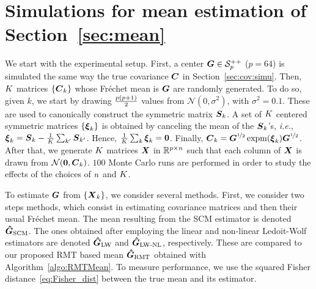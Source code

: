 %     
%     
  

\section{Simulations for mean estimation of Section~\ref{sec:mean}}
\label{app:simu_RMTMean}
We start with the experimental setup.
First, a center $\boldsymbol{G}\in\mathcal{S}^{++}_{p}$ ($p=64$) is simulated the same way the true covariance $\boldsymbol{C}$ in Section~\ref{sec:cov:simu}.
%
Then, $K$ matrices $\{\boldsymbol{C}_k\}$ whose Fréchet mean is $\boldsymbol{G}$ are randomly generated.
To do so, given $k$, we start by drawing $\frac{p(p+1)}{2}$ values from $\mathcal{N}(0,\sigma^2)$, with $\sigma^2=0.1$.
These are used to canonically construct the symmetric matrix $\boldsymbol{S}_k$.
A set of $K$ centered symmetric matrices $\{\boldsymbol{\xi}_k\}$ is obtained by canceling the mean of the $\boldsymbol{S}_k$'s, \emph{i.e.}, $\boldsymbol{\xi}_k = \boldsymbol{S}_k - \frac1{K}\sum_{k'}\boldsymbol{S}_{k'}$.
Hence, $\frac1{K}\sum_k\boldsymbol{\xi}_k=\boldsymbol{0}$.
Finally, $\boldsymbol{C}_k=\boldsymbol{G}^{\nicefrac12}\operatorname{expm}(\boldsymbol{\xi}_k)\boldsymbol{G}^{\nicefrac12}$.
%
After that, we generate $K$ matrices $\boldsymbol{X}$ in $\mathbb{R}^{p\times n}$ such that each column of $\boldsymbol{X}$ is drawn from $\mathcal{N}(\boldsymbol{0},\boldsymbol{C}_k)$.
%
$100$ Monte Carlo runs are performed in order to study the effects of the choices of $n$ and $K$.

To estimate $\boldsymbol{G}$ from $\{\boldsymbol{X}_k\}$, we consider several methods.
First, we consider two steps methods, which consist in estimating covariance matrices and then their usual Fréchet mean.
The mean resulting from the SCM estimator is denoted $\boldsymbol{\hat{G}}_{\textup{SCM}}$.
The ones obtained after employing the linear and non-linear Ledoit-Wolf estimators are denoted $\boldsymbol{\hat{G}}_{\textup{LW}}$ and $\boldsymbol{\hat{G}}_{\textup{LW-NL}}$, respectively.
These are compared to our proposed RMT based mean $\boldsymbol{\hat{G}}_{\textup{RMT}}$ obtained with Algorithm~\ref{algo:RMTMean}.
To measure performance, we use the squared Fisher distance~\eqref{eq:Fisher_dist} between the true mean and its estimator.

